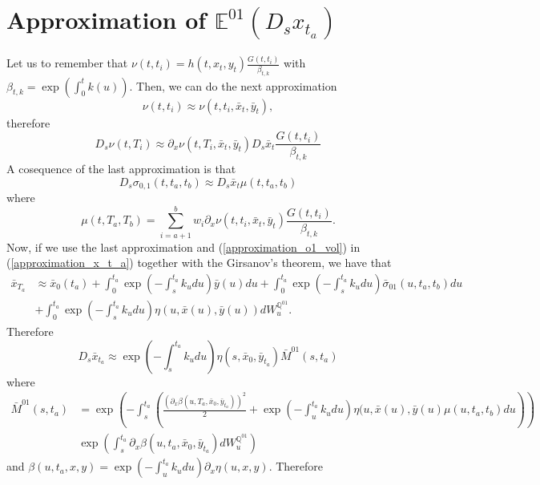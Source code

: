 \documentclass[a4paper,10pt]{article}
\newcommand{\1}{\mathbf{1}}
\begin{document}
\section{Approximation of $\mathbb{E}^{01}\left(D_s x_{t_a} \right)$}\label{approximation_under_annuity_measeure_d_s}
Let us to remember that $\nu(t,t_i)=h(t,x_t,y_t) \frac{G(t,t_i)}{\beta_{t,k}}$ with  $\beta_{t,k} = \exp\left(\int_{0}^{t}k(u)\right)$. Then, we can do the next approximation 
$$
\nu(t,t_i) \approx \nu(t,t_i, \bar{x}_t, \bar{y}_t),
$$ 
therefore 
\begin{equation*}
D_s \nu(t,T_i) \approx  \partial_x \nu(t,T_i, \bar{x}_t, \bar{y}_t) D_s \bar{x}_t  \frac{G(t,t_i)}{\beta_{t,k}}
\end{equation*}
A cosequence of the last approximation is that 
\begin{equation}
D_s \sigma_{0,1}(t,t_a,t_b) \approx  D_s \bar{x}_t \mu(t,t_a,t_b)
\end{equation}
where 
$$
\mu(t,T_a,T_b) =  \sum_{i=a+1}^{b} w_i \partial_x \nu(t,t_i, \bar{x}_t, \bar{y}_t) \frac{G(t,t_i)}{\beta_{t,k}}.
$$
Now, if we use the last approximation and (\ref{approximation_o1_vol}) in (\ref{approximation_x_t_a}) together with the Girsanov's theorem, we have that
\begin{align*}
\bar{x}_{T_a} &\approx  \bar{x}_0(t_a)  + \int_{0}^{t_a} \exp\left(-\int_{s}^{t_a}k_u du\right) \bar{y}(u) du + \int_{0}^{t_a} \exp\left(-\int_{s}^{t_a}k_u du\right) \bar{\sigma}_{01}(u,t_a,t_b) du \nonumber \\\
&+  \int_{0}^{t_a}  \exp\left(-\int_{s}^{t_a}k_u du \right) \eta(u,\bar{x}(u),\bar{y}(u)) dW_u^{\mathbb{Q}^{01}}.
\end{align*}
Therefore
\begin{equation*}
D_s \bar{x}_{t_a} \approx  \exp\left(-\int_{s}^{t_a}k_u du \right) \eta(s,\bar{x}_0,\bar{y}_{t_a})\bar{M}^{01}(s,t_a)
\end{equation*}
where
\begin{align*}
\bar{M}^{01}(s,t_a) &= \exp\left(-\int_{s}^{t_a} \left(\frac{\left(\partial_x \beta(u,T_a,\bar{x}_0,\bar{y}_{t_a})\right)^{2}}{2} + \exp\left(-\int_{u}^{t_a}k_u du\right)\eta(u,\bar{x}(u),\bar{y}(u) \mu(u,t_a,t_b) du \right)\right) \\
&\exp\left(\int_{s}^{t_a} \partial_x \beta(u,t_a,\bar{x}_0,\bar{y}_{t_a}) dW^{\mathbb{Q}^{01}}_u \right)
\end{align*}
and $\beta(u,t_a,x,y) = \exp\left(-\int_{u}^{t_a}k_u du\right) \partial_x \eta(u,x,y)$. Therefore
\end{document}

